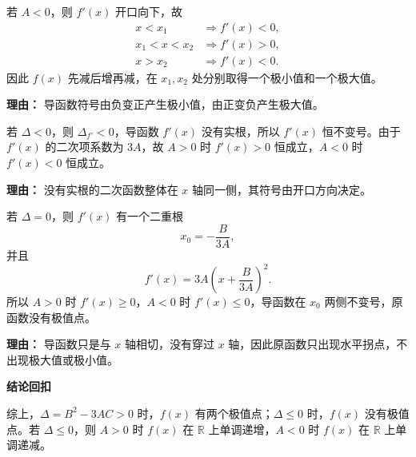 \begin{proofbox}
\begin{description}[style=nextline, leftmargin=2.8em, labelsep=0.5em, itemsep=0.55em]
		\item[\textbf{步骤五（$A<0$ 的单调趋势）：}]
		      若 $A<0$，则 $f'(x)$ 开口向下，故
		      \[
			      \begin{aligned}
				      x<x_1     & \Rightarrow f'(x)<0, \\
				      x_1<x<x_2 & \Rightarrow f'(x)>0, \\
				      x>x_2     & \Rightarrow f'(x)<0.
			      \end{aligned}
		      \]
		      因此 $f(x)$ 先减后增再减，在 $x_1,x_2$ 处分别取得一个极小值和一个极大值。
		      \par\textbf{理由：} 导函数符号由负变正产生极小值，由正变负产生极大值。

		\item[\textbf{步骤六（$\Delta<0$ 时）：}]
		      若 $\Delta<0$，则 $\Delta_{f'}<0$，导函数 $f'(x)$ 没有实根，所以 $f'(x)$ 恒不变号。由于 $f'(x)$ 的二次项系数为 $3A$，故 $A>0$ 时 $f'(x)>0$ 恒成立，$A<0$ 时 $f'(x)<0$ 恒成立。
		      \par\textbf{理由：} 没有实根的二次函数整体在 $x$ 轴同一侧，其符号由开口方向决定。

		\item[\textbf{步骤七（$\Delta=0$ 时）：}]
		      若 $\Delta=0$，则 $f'(x)$ 有一个二重根
		      \[
			      x_0=-\frac{B}{3A},
		      \]
		      并且
		      \[
			      f'(x)=3A\left(x+\frac{B}{3A}\right)^2.
		      \]
		      所以 $A>0$ 时 $f'(x)\ge0$，$A<0$ 时 $f'(x)\le0$，导函数在 $x_0$ 两侧不变号，原函数没有极值点。
		      \par\textbf{理由：} 导函数只是与 $x$ 轴相切，没有穿过 $x$ 轴，因此原函数只出现水平拐点，不出现极大值或极小值。
	\end{description}

	\medskip
	\textbf{\textcolor{CProof}{结论回扣}}

	综上，$\Delta=B^2-3AC>0$ 时，$f(x)$ 有两个极值点；$\Delta\le0$ 时，$f(x)$ 没有极值点。若 $\Delta\le0$，则 $A>0$ 时 $f(x)$ 在 $\mathbb{R}$ 上单调递增，$A<0$ 时 $f(x)$ 在 $\mathbb{R}$ 上单调递减。
\end{proofbox}